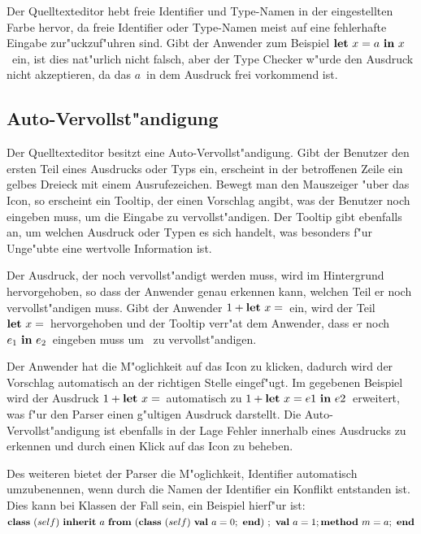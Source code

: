 Der Quelltexteditor hebt freie Identifier und Type-Namen in der eingestellten
Farbe hervor, da freie Identifier oder Type-Namen meist auf eine
fehlerhafte Eingabe zur"uckzuf"uhren sind. Gibt der Anwender zum Beispiel
\glqq$\bli{x}{a}{x}$\grqq\ ein, ist dies nat"urlich nicht falsch, aber
der Type Checker w"urde den Ausdruck nicht akzeptieren, da das 
\glqq$a$\grqq\ in dem Ausdruck frei vorkommend ist.

\subsection{Auto-Vervollst"andigung}
\label{Auto-Vervollstaendigung}
Der Quelltexteditor besitzt eine Auto-Vervollst"andigung. Gibt der Benutzer
den ersten Teil eines Ausdrucks oder Typs ein, erscheint in der betroffenen
Zeile ein gelbes Dreieck mit einem Ausrufezeichen. Bewegt man den Mauszeiger 
"uber das Icon, so erscheint ein Tooltip, der einen Vorschlag angibt, was der
Benutzer noch eingeben muss, um die Eingabe zu vervollst"andigen. Der
Tooltip gibt ebenfalls an, um welchen Ausdruck oder Typen es sich handelt, was
besonders f"ur Unge"ubte eine wertvolle Information ist.

Der Ausdruck, der noch vervollst"andigt werden muss, wird im Hintergrund
hervorgehoben, so dass der Anwender genau erkennen kann, welchen Teil er
noch vervollst"andigen muss. Gibt der Anwender \glqq$\infix{+}{1}{\blet\ x =}$\grqq\ 
ein, wird der Teil \glqq$\blet\ x =$\grqq\ hervorgehoben und der Tooltip
verr"at dem Anwender, dass er noch \glqq$e_1\ \bin\ e_2$\grqq\ eingeben muss
um \glqq{\bf Let}\grqq\ zu vervollst"andigen.

Der Anwender hat die M"oglichkeit auf das Icon zu klicken, dadurch wird der 
Vorschlag automatisch an der richtigen Stelle eingef"ugt. Im gegebenen Beispiel
wird der Ausdruck \glqq$\infix{+}{1}{\blet\ x =}$\grqq\ automatisch zu
\glqq$\infix{+}{1}{\bli{x}{e1}{e2}}$\grqq\ erweitert, was f"ur den Parser einen
g"ultigen Ausdruck darstellt. Die Auto-Vervollst"andigung ist ebenfalls in
der Lage Fehler innerhalb eines Ausdrucks zu erkennen und durch einen Klick
auf das Icon zu beheben.

Des weiteren bietet der Parser die M"oglichkeit, Identifier automatisch
umzubenennen, wenn durch die Namen der Identifier ein Konflikt entstanden
ist. Dies kann bei Klassen der Fall sein, ein Beispiel hierf"ur ist:\\[2mm]
\glqq$\class{self}{\inherit{a}{(\class{self}{\val{a}{0}})}{\val{a}{1} \method{m}{a}}}$\grqq

